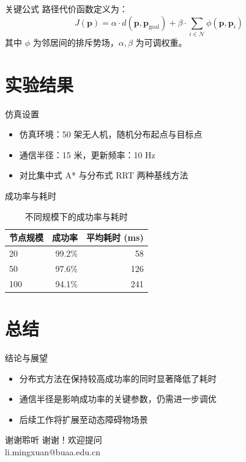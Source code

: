 \documentclass{ctexbeamer}
\begin{document}
\begin{frame}{关键公式}
  路径代价函数定义为：
  \[
    J(\mathbf{p}) = \alpha \cdot d(\mathbf{p}, \mathbf{p}_{\text{goal}}) + \beta \cdot \sum_{i \in \mathcal{N}} \phi(\mathbf{p}, \mathbf{p}_i)
  \]
  其中 $\phi$ 为邻居间的排斥势场，$\alpha, \beta$ 为可调权重。
\end{frame}

\section{实验结果}

\begin{frame}{仿真设置}
  \begin{itemize}
    \item 仿真环境：50 架无人机，随机分布起点与目标点
    \item 通信半径：15 米，更新频率：10 Hz
    \item 对比集中式 A* 与分布式 RRT 两种基线方法
  \end{itemize}
\end{frame}

\begin{frame}{成功率与耗时}
  \begin{table}
    \centering
    \begin{tabular}{lrr}
      \toprule
      节点规模 & 成功率 & 平均耗时 (ms) \\
      \midrule
      20 & 99.2\% & 58 \\
      50 & 97.6\% & 126 \\
      100 & 94.1\% & 241 \\
      \bottomrule
    \end{tabular}
    \caption{不同规模下的成功率与耗时}
  \end{table}
\end{frame}

\section{总结}

\begin{frame}{结论与展望}
  \begin{itemize}
    \item 分布式方法在保持较高成功率的同时显著降低了耗时
    \item 通信半径是影响成功率的关键参数，仍需进一步调优
    \item 后续工作将扩展至动态障碍物场景
  \end{itemize}
\end{frame}

\begin{frame}{谢谢聆听}
  \centering
  {\Large 谢谢！欢迎提问}\\[1em]
  li.mingxuan@buaa.edu.cn
\end{frame}
\end{document}
